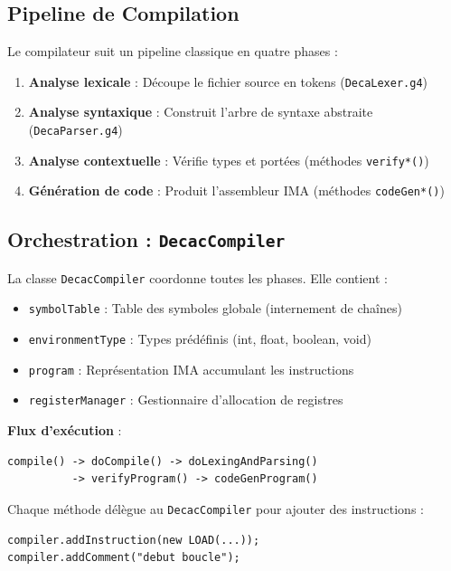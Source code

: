 \documentclass[12pt,a4paper]{article}
\begin{document}
\subsection{Pipeline de Compilation}

Le compilateur suit un pipeline classique en quatre phases :

\begin{enumerate}[itemsep=0.3em]
    \item \textbf{Analyse lexicale} : Découpe le fichier source en tokens (\texttt{DecaLexer.g4})
    \item \textbf{Analyse syntaxique} : Construit l'arbre de syntaxe abstraite (\texttt{DecaParser.g4})
    \item \textbf{Analyse contextuelle} : Vérifie types et portées (méthodes \texttt{verify*()})
    \item \textbf{Génération de code} : Produit l'assembleur IMA (méthodes \texttt{codeGen*()})
\end{enumerate}

\subsection{Orchestration : \texttt{DecacCompiler}}

La classe \texttt{DecacCompiler} coordonne toutes les phases. Elle contient :

\begin{itemize}[itemsep=0.2em]
    \item \texttt{symbolTable} : Table des symboles globale (internement de chaînes)
    \item \texttt{environmentType} : Types prédéfinis (int, float, boolean, void)
    \item \texttt{program} : Représentation IMA accumulant les instructions
    \item \texttt{registerManager} : Gestionnaire d'allocation de registres
\end{itemize}

\textbf{Flux d'exécution} :

\begin{lstlisting}[style=bashstyle]
compile() -> doCompile() -> doLexingAndParsing() 
          -> verifyProgram() -> codeGenProgram()
\end{lstlisting}

Chaque méthode délègue au \texttt{DecacCompiler} pour ajouter des instructions :

\begin{lstlisting}[style=javastyle]
compiler.addInstruction(new LOAD(...));
compiler.addComment("debut boucle");
\end{lstlisting}
\end{document}
